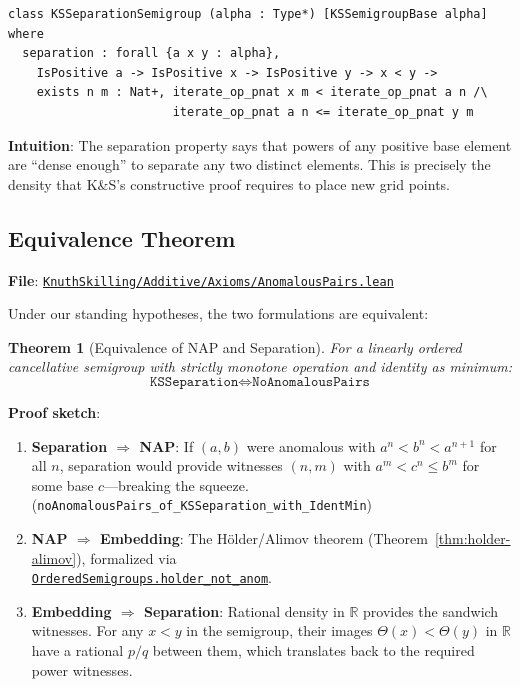\documentclass[11pt]{article}
\newtheorem{theorem}{Theorem}[section]
\theoremstyle{definition}
\theoremstyle{remark}
\begin{document}
\begin{lstlisting}[caption={Separation axiom (identity-free, Algebra.lean:335)},numbers=none]
class KSSeparationSemigroup (alpha : Type*) [KSSemigroupBase alpha] where
  separation : forall {a x y : alpha},
    IsPositive a -> IsPositive x -> IsPositive y -> x < y ->
    exists n m : Nat+, iterate_op_pnat x m < iterate_op_pnat a n /\
                       iterate_op_pnat a n <= iterate_op_pnat y m
\end{lstlisting}

\textbf{Intuition}: The separation property says that powers of any positive base element are
``dense enough'' to separate any two distinct elements. This is precisely the density that
K\&S's constructive proof requires to place new grid points.

\subsection{Equivalence Theorem}
\label{subsec:equivalence}

\textbf{File}: \href{https://github.com/zariuq/ks-foundations-of-inference/blob/main/KnuthSkilling/Additive/Axioms/AnomalousPairs.lean}{\texttt{KnuthSkilling/Additive/Axioms/AnomalousPairs.lean}}

Under our standing hypotheses, the two formulations are equivalent:

\begin{theorem}[Equivalence of NAP and Separation]
\label{thm:nap-sep-equiv}
For a linearly ordered cancellative semigroup with strictly monotone operation and identity as minimum:
\[
  \texttt{KSSeparation} \Longleftrightarrow \texttt{NoAnomalousPairs}
\]
\end{theorem}

\textbf{Proof sketch}:
\begin{enumerate}
\item \textbf{Separation $\Rightarrow$ NAP}: If $(a, b)$ were anomalous with $a^n < b^n < a^{n+1}$
      for all $n$, separation would provide witnesses $(n, m)$ with $a^m < c^n \leq b^m$ for some
      base $c$---breaking the squeeze.
      \\
      (\texttt{noAnomalousPairs\_of\_KSSeparation\_with\_IdentMin})

\item \textbf{NAP $\Rightarrow$ Embedding}: The H\"older/Alimov theorem (Theorem~\ref{thm:holder-alimov}),
      formalized via
      \\
      \href{https://github.com/ericluap/OrderedSemigroups/blob/main/OrderedSemigroups/Holder.lean\#L26}{\texttt{OrderedSemigroups.holder\_not\_anom}}.

\item \textbf{Embedding $\Rightarrow$ Separation}: Rational density in $\mathbb{R}$ provides the
      sandwich witnesses. For any $x < y$ in the semigroup, their images $\Theta(x) < \Theta(y)$
      in $\mathbb{R}$ have a rational $p/q$ between them, which translates back to the required
      power witnesses.
\end{enumerate}
\end{document}
